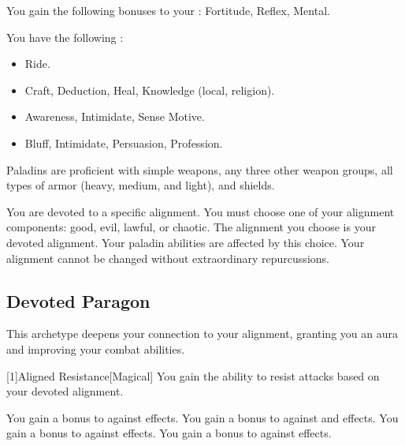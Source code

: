         You gain the following bonuses to your :  Fortitude,  Reflex,  Mental.

        You have the following :
        \begin{itemize}
            \item {} Ride.
            \item {} Craft, Deduction, Heal, Knowledge (local, religion).
            \item {} Awareness, Intimidate, Sense Motive.
            \item {} Bluff, Intimidate, Persuasion, Profession.
        \end{itemize}

        Paladins are proficient with simple weapons, any three other weapon groups, all types of armor (heavy, medium, and light), and shields.

        You are devoted to a specific alignment.
        You must choose one of your alignment components: good, evil, lawful, or chaotic.
        The alignment you choose is your devoted alignment.
        Your paladin abilities are affected by this choice.
        Your alignment cannot be changed without extraordinary repurcussions.

    \subsection{Devoted Paragon}
        This archetype deepens your connection to your alignment, granting you an aura and improving your combat abilities.

        [1]{Aligned Resistance}[Magical]
        You gain the ability to resist attacks based on your devoted alignment.

         You gain a  bonus to  against  effects.
         You gain a  bonus to  against  and  effects.
         You gain a  bonus to  against  effects.
         You gain a  bonus to  against  effects.

